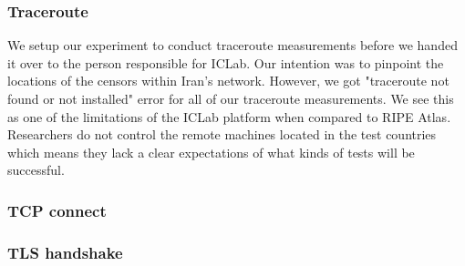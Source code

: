 \subsubsection{Traceroute} We setup our experiment to conduct traceroute measurements before we handed it over to the person responsible for ICLab. Our intention was to pinpoint the locations of the censors within Iran’s network. However, we got "traceroute not found or not installed" error for all of our traceroute measurements. We see this as one of the limitations of the ICLab platform when compared to RIPE Atlas. Researchers do not control the remote machines located in the test countries which means they lack a clear expectations of what kinds of tests will be successful. \\
\subsubsection{TCP connect} 
\subsubsection{TLS handshake}
